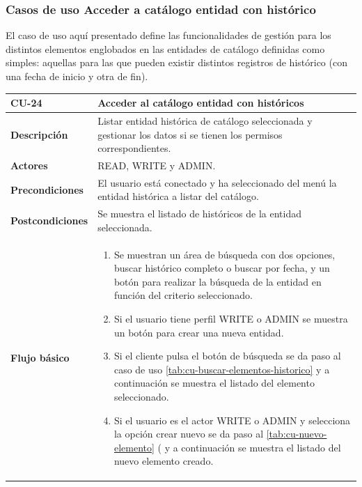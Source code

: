 \subsubsection{Casos de uso Acceder a catálogo entidad con histórico} 
\label{sub:cu-catalogo-historico}



El caso de uso aquí presentado define las funcionalidades de gestión para los distintos elementos englobados en las entidades de catálogo definidas como simples: aquellas para las que pueden existir distintos registros de histórico (con una fecha de inicio y otra de fin).


\begin{table} [H]
    \centering
    \setlength{\leftmargini}{0.4cm}
	\resizebox{14cm}{!} { %
    \begin{tabular}{| m{3cm} | m{11cm} |}   
    \hline
	  \textbf{CU-24} & \textbf{Acceder al catálogo entidad con históricos} \\\hline
	  \textbf{Descripción} & Listar entidad histórica de catálogo seleccionada y gestionar los datos si se tienen los permisos correspondientes. \\\hline
	  \textbf{Actores} & READ, WRITE y ADMIN. \\\hline
	  \textbf{Precondiciones} & El usuario está conectado y ha seleccionado del menú la entidad histórica a listar del catálogo. \\\hline
	  \textbf{Postcondiciones} & Se muestra el listado de históricos de la entidad seleccionada. \\\hline
	  \textbf{Flujo básico} & 
		\begin{enumerate}
	  	\item Se muestran un área de búsqueda con dos opciones, buscar histórico completo o buscar por fecha, y un botón para realizar la búsqueda de la entidad en función del criterio seleccionado.
	  	\item Si el usuario tiene perfil WRITE o ADMIN se muestra un botón para crear una nueva entidad.
	  	\item Si el cliente pulsa el botón de búsqueda se da paso al caso de uso \ref{tab:cu-buscar-elementos-historico} y a continuación se muestra el listado del elemento seleccionado.
	  	\item Si el usuario es el actor WRITE o ADMIN y selecciona la opción crear nuevo se da paso al \ref{tab:cu-nuevo-elemento} (\pageref{tab:cu-nuevo-elemento} y a continuación se muestra el listado del nuevo elemento creado.

\end{enumerate}
\end{tabular}}
\end{table}
